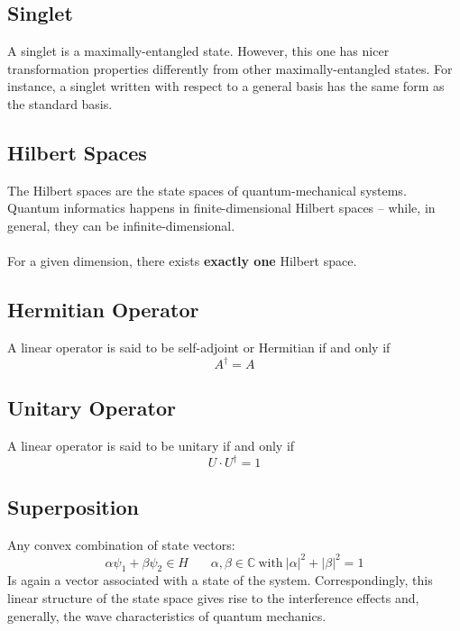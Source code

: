 \documentclass{article}
\begin{document}
\subsection{Singlet}
A singlet is a maximally-entangled state. However, this one has nicer transformation properties differently from other maximally-entangled states. For instance, a singlet written with respect to a general basis has the same form as the standard basis.

\subsection{Hilbert Spaces}
The Hilbert spaces are the state spaces of quantum-mechanical systems. Quantum informatics happens in finite-dimensional Hilbert spaces -- while, in general, they can be infinite-dimensional. \\ \\
For a given dimension, there exists \textbf{exactly one} Hilbert space.

\subsection{Hermitian Operator}
A linear operator is said to be self-adjoint or Hermitian if and only if
\[ A^\dagger = A \]

\subsection{Unitary Operator}
A linear operator is said to be unitary if and only if
\[ U \cdot U^\dagger = 1 \]

\subsection{Superposition}
Any convex combination of state vectors:
\[ \alpha \psi_1 + \beta \psi_2 \in H ~~~~~~~~ \alpha, \beta \in \mathbb{C}~\text{with}~ |\alpha|^2 + |\beta|^2 = 1 \]
Is again a vector associated with a state of the system. Correspondingly, this linear structure of the state space gives rise to the interference effects and, generally, the wave characteristics of quantum mechanics.
\end{document}
